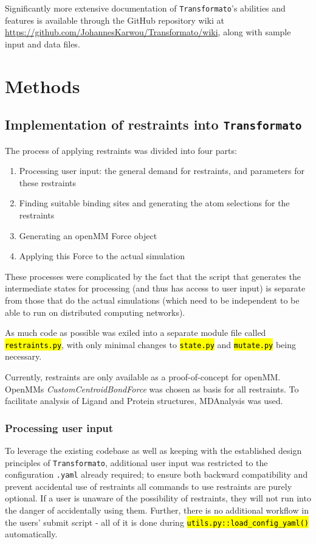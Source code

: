 \documentclass[oneside]{scrreprt}
\newcommand{\code}[1]{\texttt{\hl{#1}}}
\begin{document}
Significantly more extensive documentation of \texttt{Transformato}'s abilities and features is available through the GitHub repository wiki at \url{https://github.com/JohannesKarwou/Transformato/wiki}, along with sample input and data files.


\chapter{Methods}
\section{Implementation of restraints into \texttt{Transformato}}

The process of applying restraints was divided into four parts:

\begin{enumerate}
    \item Processing user input: the general demand for restraints, and parameters for these restraints
    \item Finding suitable binding sites and generating the atom selections for the restraints
    \item Generating an openMM Force object
    \item Applying this Force to the actual simulation

\end{enumerate}

These processes were complicated by the fact that the script that generates the intermediate states for processing (and thus has access to user input) is separate from those that do the actual simulations (which need to be independent to be able to run on distributed computing networks).



 As much code as possible was exiled into a separate module file called \code{restraints.py}, with only minimal changes to \code{state.py} and \code{mutate.py} being necessary. 

Currently, restraints are only available as a proof-of-concept for openMM. OpenMMs \emph{CustomCentroidBondForce} was chosen as basis for all restraints. To facilitate analysis of Ligand and Protein structures, MDAnalysis\cite{agrawal2011,oliver_beckstein-proc-scipy-2016} was used.

\subsection{Processing user input}
To leverage the existing codebase as well as keeping with the established design principles of \texttt{Transformato}, additional user input was restricted to the configuration \texttt{.yaml} already required; to ensure both backward compatibility and prevent accidental use of restraints all commands to use restraints are purely optional. If a user is unaware of the possibility of restraints, they will not run into the danger of accidentally using them. Further, there is no additional workflow in the users' submit script - all of it is done during \code{utils.py::load\_config\_yaml()} automatically.
\end{document}

